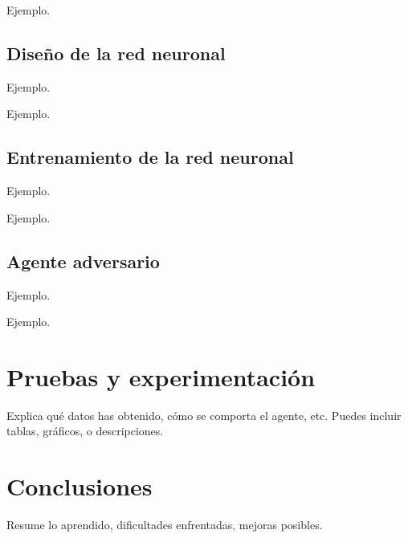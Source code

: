 \documentclass[conference]{IEEEtran}
\begin{document}
Ejemplo.

\subsection{Diseño de la red neuronal}
Ejemplo.

Ejemplo.

\subsection{Entrenamiento de la red neuronal}
Ejemplo.

Ejemplo.

\subsection{Agente adversario}
Ejemplo.

Ejemplo.

\section{Pruebas y experimentación}
Explica qué datos has obtenido, cómo se comporta el agente, etc. Puedes incluir tablas, gráficos, o descripciones.

\section{Conclusiones}
Resume lo aprendido, dificultades enfrentadas, mejoras posibles.




\end{document}
